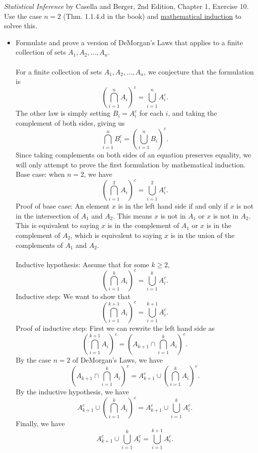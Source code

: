 \documentclass[12pt]{article}
\newenvironment{problem}[2][Problem]{\begin{trivlist}
\item[\hskip \labelsep {\bfseries #1}\hskip \labelsep {\bfseries #2.}]}
{\end{trivlist}}
\begin{document}
\begin{problem}{4} 
  \textit{Statistical Inference} by Casella and Berger, 2nd Edition, Chapter 1, 
  Exercise 10. Use the case $n = 2$ (Thm. 1.1.4.d in the book) and 
  \underline{mathematical induction} to solvee this.
  \begin{itemize}
    \item [10] Formulate and prove a version of DeMorgan's Laws that 
    applies to a finite collection of sets $A_1, A_2, \ldots, A_n$.
    \\\\
    For a finite collection of sets $A_1, A_2, \ldots, A_n$,
    we conjecture that the formulation is
    \[
      \left(\bigcap_{i=1}^n A_i\right)^c = \bigcup_{i=1}^nA_i^c.
    \]
    The other law is simply setting $B_i = A_i^c$ for each $i$,
    and taking the complement of both sides, giving us
    \[
      \bigcap_{i=1}^n B_i^c = \left(\bigcup_{i=1}^nB_i\right)^c.
    \]
    Since taking complements on both sides of an equation preserves equality,
    we will only attempt to prove the first formulation by 
    mathematical induction.\\
    Base case: when $n=2$, we have
    \[
      \left(\bigcap_{i=1}^2 A_i\right)^c = \bigcup_{i=1}^2A_i^c.
    \]
    Proof of base case: An element $x$ is in the left hand side if and only if
    $x$ is not in the intersection of $A_1$ and $A_2$. This means
    $x$ is not in $A_1$ or $x$ is not in $A_2$. This is equivalent to
    saying $x$ is in the complement of $A_1$ or $x$ is in the complement of
    $A_2$, which is equivalent to saying $x$ is in the union of the
    complements of $A_1$ and $A_2$.\\\\
    Inductive hypothesis: Assume that for some $k \ge 2$,
    \[
      \left(\bigcap_{i=1}^k A_i\right)^c = \bigcup_{i=1}^kA_i^c.
    \]
    Inductive step: We want to show that
    \[
      \left(\bigcap_{i=1}^{k+1} A_i\right)^c = \bigcup_{i=1}^{k+1}A_i^c.
    \]
    Proof of inductive step: First we can rewrite the left hand side as
    \[
      \left(\bigcap_{i=1}^{k+1} A_i\right)^c = \left(A_{k+1} \cap
      \bigcap_{i=1}^k A_i\right)^c.
    \]
    By the case $n=2$ of DeMorgan's Laws, we have
    \[
      \left(A_{k+1} \cap \bigcap_{i=1}^k A_i\right)^c = A_{k+1}^c \cup
      \left(\bigcap_{i=1}^k A_i\right)^c.
    \]
    By the inductive hypothesis, we have
    \[
      A_{k+1}^c \cup \left(\bigcap_{i=1}^k A_i\right)^c = A_{k+1}^c \cup
      \bigcup_{i=1}^kA_i^c.
    \]
    Finally, we have
    \[
      A_{k+1}^c \cup \bigcup_{i=1}^kA_i^c = \bigcup_{i=1}^{k+1}A_i^c.
    \]
  \end{itemize}
\end{problem}
\end{document}
